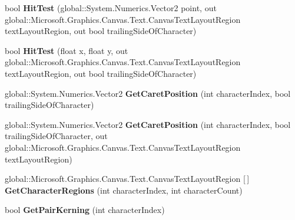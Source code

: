 \begin{DoxyCompactItemize}
bool {\bfseries Hit\+Test} (global\+::\+System.\+Numerics.\+Vector2 point, out global\+::\+Microsoft.\+Graphics.\+Canvas.\+Text.\+Canvas\+Text\+Layout\+Region text\+Layout\+Region, out bool trailing\+Side\+Of\+Character)
\item 
\mbox{\label{class_microsoft_1_1_graphics_1_1_canvas_1_1_text_1_1_canvas_text_layout_a2bf7d833ba8cf12cacb9b8c441309e4e}} 
bool {\bfseries Hit\+Test} (float x, float y, out global\+::\+Microsoft.\+Graphics.\+Canvas.\+Text.\+Canvas\+Text\+Layout\+Region text\+Layout\+Region, out bool trailing\+Side\+Of\+Character)
\item 
\mbox{\label{class_microsoft_1_1_graphics_1_1_canvas_1_1_text_1_1_canvas_text_layout_ad61d630b4143924a996579c3c14e39bd}} 
global\+::\+System.\+Numerics.\+Vector2 {\bfseries Get\+Caret\+Position} (int character\+Index, bool trailing\+Side\+Of\+Character)
\item 
\mbox{\label{class_microsoft_1_1_graphics_1_1_canvas_1_1_text_1_1_canvas_text_layout_a570264c3b7269effae081d1e5a88df05}} 
global\+::\+System.\+Numerics.\+Vector2 {\bfseries Get\+Caret\+Position} (int character\+Index, bool trailing\+Side\+Of\+Character, out global\+::\+Microsoft.\+Graphics.\+Canvas.\+Text.\+Canvas\+Text\+Layout\+Region text\+Layout\+Region)
\item 
\mbox{\label{class_microsoft_1_1_graphics_1_1_canvas_1_1_text_1_1_canvas_text_layout_a7a2da41d929849793b28b02d8754c790}} 
global\+::\+Microsoft.\+Graphics.\+Canvas.\+Text.\+Canvas\+Text\+Layout\+Region \mbox{[}$\,$\mbox{]} {\bfseries Get\+Character\+Regions} (int character\+Index, int character\+Count)
\item 
\mbox{\label{class_microsoft_1_1_graphics_1_1_canvas_1_1_text_1_1_canvas_text_layout_add821cfda40c6e413e94792d52f961f5}} 
bool {\bfseries Get\+Pair\+Kerning} (int character\+Index)
\item 
\mbox{\label{class_microsoft_1_1_graphics_1_1_canvas_1_1_text_1_1_canvas_text_layout_ac079598c499d635ad51a5e304c41da93}} 

\end{DoxyCompactItemize}

